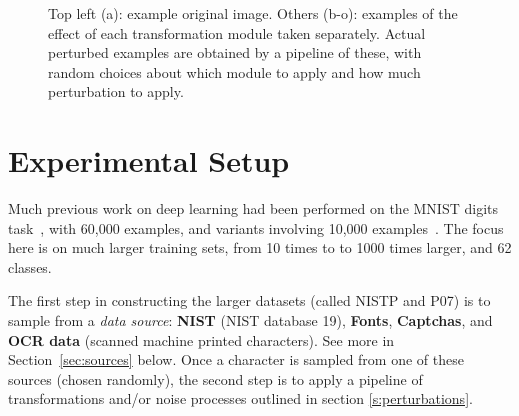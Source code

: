 \documentclass{article} %
\begin{document}
\begin{figure}[ht]
\caption{Top left (a): example original image. Others (b-o): examples of the effect
of each transformation module taken separately. Actual perturbed examples are obtained by
a pipeline of these, with random choices about which module to apply and how much perturbation
to apply.}
\label{fig:transform}
\end{figure}

\section{Experimental Setup}

Much previous work on deep learning had been performed on
the MNIST digits task~\citep{Hinton06,ranzato-07-small,Bengio-nips-2006,Salakhutdinov+Hinton-2009},
with 60,000 examples, and variants involving 10,000
examples~\citep{Larochelle-jmlr-2009,VincentPLarochelleH2008-very-small}.
The focus here is on much larger training sets, from 10 times to 
to 1000 times larger, and 62 classes.

The first step in constructing the larger datasets (called NISTP and P07) is to sample from
a {\em data source}: {\bf NIST} (NIST database 19), {\bf Fonts}, {\bf Captchas},
and {\bf OCR data} (scanned machine printed characters). See more in 
Section~\ref{sec:sources} below. Once a character
is sampled from one of these sources (chosen randomly), the second step is to
apply a pipeline of transformations and/or noise processes outlined in section \ref{s:perturbations}.
\end{document}
